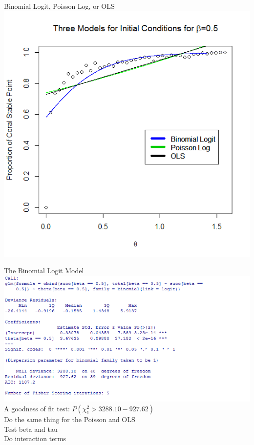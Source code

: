 \begin{frame}{Binomial Logit, Poisson Log, or OLS}
\includegraphics[scale=.425]{theta_three_models.png}
\end{frame}

\begin{frame}{The Binomial Logit Model}
\includegraphics[scale=.5]{theta_logit_summary.png}\\
A goodness of fit test: $P(\chi^{2}_{1}>3288.10-927.62)$\\
Do the same thing for the Poisson and OLS\\
Test beta and tau\\
Do interaction terms\\
\end{frame}



